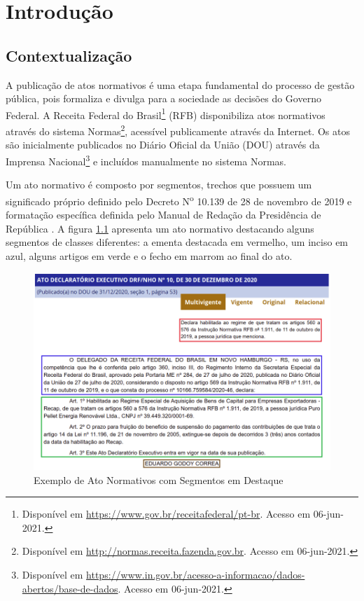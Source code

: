 \chapter{Introdução}

\section{Contextualização}

A publicação de atos normativos é uma etapa fundamental do processo de gestão pública, pois formaliza e divulga para a sociedade as decisões do Governo Federal. A Receita Federal do Brasil\footnote{Disponível em \url{https://www.gov.br/receitafederal/pt-br}. Acesso em 06-jun-2021.} (RFB) disponibiliza atos normativos através do sistema Normas\footnote{Disponível em \url{http://normas.receita.fazenda.gov.br}. Acesso em 06-jun-2021.}, acessível publicamente através da Internet. Os atos são inicialmente publicados no Diário Oficial da União (DOU) através da Imprensa Nacional\footnote{Disponível em \url{https://www.in.gov.br/acesso-a-informacao/dados-abertos/base-de-dados}. Acesso em 06-jun-2021.} e incluídos manualmente no sistema Normas.

Um ato normativo é composto por segmentos, trechos que possuem um significado próprio definido pelo Decreto N\textsuperscript{o} 10.139 de 28 de novembro de 2019 \cite{Decreto10139} e formatação específica definida pelo Manual de Redação da Presidência de República \cite{ManualRedacao2018}. A figura \ref{fig:segmentos} apresenta um ato normativo destacando alguns segmentos de classes diferentes: a ementa destacada em vermelho, um inciso em azul, alguns artigos em verde e o fecho em marrom ao final do ato. 

\begin{figure}[h]
	\caption{Exemplo de Ato Normativos com Segmentos em Destaque}
	\center
	\label{fig:segmentos}
	\includegraphics[scale=1.9]{introducao/segmentos.png}
\end{figure}

